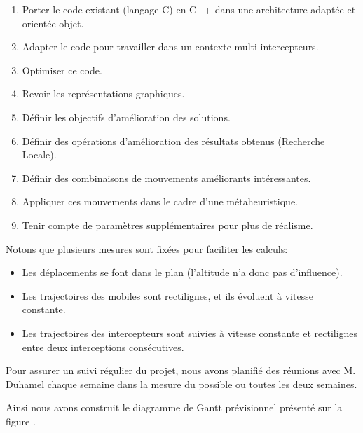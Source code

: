 		\begin{enumerate}
			\item Porter le code existant (langage C) en C++ dans une architecture adaptée et orientée objet.
			\item Adapter le code pour travailler dans un contexte multi-intercepteurs.
			\item Optimiser ce code.
			\item Revoir les représentations graphiques.
			\item Définir les objectifs d'amélioration des solutions.
			\item Définir des opérations d'amélioration des résultats obtenus (Recherche Locale).
			\item Définir des combinaisons de mouvements améliorants intéressantes.
			\item Appliquer ces mouvements dans le cadre d'une métaheuristique.
			\item Tenir compte de paramètres supplémentaires pour plus de réalisme.
		\end{enumerate}

		Notons que plusieurs mesures sont fixées pour faciliter les calculs:
		\begin{itemize}
			\item Les déplacements se font dans le plan (l'altitude n'a donc pas d'influence).
			\item Les trajectoires des mobiles sont rectilignes, et ils évoluent à vitesse constante.
			\item Les trajectoires des intercepteurs sont suivies à vitesse constante et rectilignes entre deux interceptions consécutives.
		\end{itemize}

		Pour assurer un suivi régulier du projet, nous avons planifié des réunions avec M. Duhamel chaque semaine dans la mesure du possible ou toutes les deux semaines.

		Ainsi nous avons construit le diagramme de Gantt prévisionnel présenté sur la figure .
